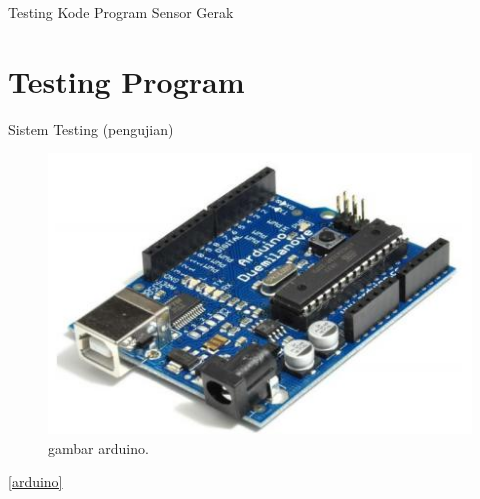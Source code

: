
Testing Kode Program Sensor Gerak

\section {Testing Program}
Sistem Testing (pengujian)

\begin{figure}[ht]
\centerline{\includegraphics[width=1\textwidth]{figures/arduino.JPG}}
\caption{gambar arduino.}
\label{arduino.JPG}
\end{figure}
\ref{arduino}

